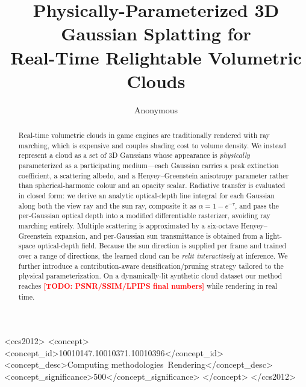 \documentclass[sigconf]{acmart}
\newcommand{\todo}[1]{\textcolor{red}{\textbf{[TODO: #1]}}}
\begin{document}
\title{Physically-Parameterized 3D Gaussian Splatting for\\
       Real-Time Relightable Volumetric Clouds}

\author{Anonymous}

\begin{abstract}
Real-time volumetric clouds in game engines are traditionally rendered with
ray marching, which is expensive and couples shading cost to volume density.
We instead represent a cloud as a set of 3D Gaussians whose appearance is
\emph{physically} parameterized as a participating medium---each Gaussian
carries a peak extinction coefficient, a scattering albedo, and a
Henyey--Greenstein anisotropy parameter rather than spherical-harmonic colour
and an opacity scalar. Radiative transfer is evaluated in closed form: we
derive an analytic optical-depth line integral for each Gaussian along both the
view ray and the sun ray, composite it as $\alpha = 1 - e^{-\tau}$, and pass
the per-Gaussian optical depth into a modified differentiable rasterizer,
avoiding ray marching entirely. Multiple scattering is approximated by a
six-octave Henyey--Greenstein expansion, and per-Gaussian sun transmittance is
obtained from a light-space optical-depth field. Because the sun direction is
supplied per frame and trained over a range of directions, the learned cloud
can be \emph{relit interactively} at inference. We further introduce a
contribution-aware densification/pruning strategy tailored to the physical
parameterization. On a dynamically-lit synthetic cloud dataset our method
reaches \todo{PSNR/SSIM/LPIPS final numbers} while rendering in real time.
\end{abstract}

\begin{CCSXML}
<ccs2012>
 <concept>
  <concept_id>10010147.10010371.10010396</concept_id>
  <concept_desc>Computing methodologies~Rendering</concept_desc>
  <concept_significance>500</concept_significance>
 </concept>
</ccs2012>
\end{CCSXML}


\maketitle
\end{document}
